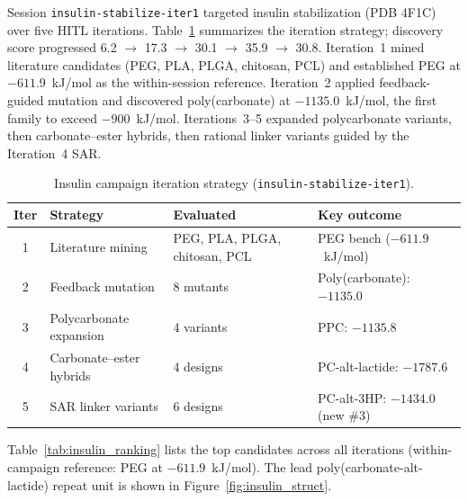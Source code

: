 \documentclass[twocolumn]{fairmeta}
\begin{document}
Session \texttt{insulin-stabilize-iter1} targeted insulin stabilization (PDB 4F1C) over five HITL iterations.
Table~\ref{tab:insulin_strategy} summarizes the iteration strategy; discovery score progressed 6.2 $\to$ 17.3 $\to$ 30.1 $\to$ 35.9 $\to$ 30.8.
Iteration~1 mined literature candidates (PEG, PLA, PLGA, chitosan, PCL) and established PEG at $-611.9$~kJ/mol as the within-session reference.
Iteration~2 applied feedback-guided mutation and discovered poly(carbonate) at $-1135.0$~kJ/mol, the first family to exceed $-900$~kJ/mol.
Iterations~3--5 expanded polycarbonate variants, then carbonate--ester hybrids, then rational linker variants guided by the Iteration~4 SAR.

\begin{table}[t]
\centering
\caption{Insulin campaign iteration strategy (\texttt{insulin-stabilize-iter1}).}
\label{tab:insulin_strategy}
\scriptsize
\setlength{\tabcolsep}{3pt}
\begin{tabularx}{\columnwidth}{clXl}
\toprule
Iter & Strategy & Evaluated & Key outcome \\
\midrule
1 & Literature mining & PEG, PLA, PLGA, chitosan, PCL & PEG bench ($-611.9$~kJ/mol) \\
2 & Feedback mutation & 8 mutants & Poly(carbonate): $-1135.0$ \\
3 & Polycarbonate expansion & 4 variants & PPC: $-1135.8$ \\
4 & Carbonate--ester hybrids & 4 designs & PC-alt-lactide: $-1787.6$ \\
5 & SAR linker variants & 6 designs & PC-alt-3HP: $-1434.0$ (new \#3) \\
\bottomrule
\end{tabularx}
\end{table}

Table~\ref{tab:insulin_ranking} lists the top candidates across all iterations (within-campaign reference: PEG at $-611.9$~kJ/mol).
The lead poly(carbonate-alt-lactide) repeat unit is shown in Figure~\ref{fig:insulin_struct}.
\end{document}
